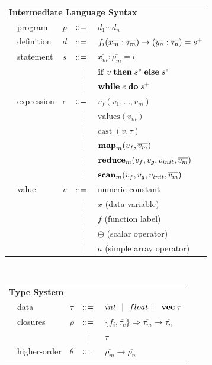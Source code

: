 \documentclass[preprint]{sigplanconf}
\begin{document}
  \begin{tabular}{m{0.1cm}m{1.5cm}m{0.1cm}m{0.2cm}p{4.8cm}}
   \multicolumn{5}{l}{\textbf{Intermediate Language Syntax}}  \\[4pt]
  & program & $p$ &  $::=$   &  $d_1 \cdots d_n $ \\[4pt]
  & definition & $d$ & $::=$ & $f_i(\overline{x_m} : \overline{\tau_m}) \rightarrow (\overline{y_n} : \overline{\tau_n}) =s^{\small{+}}$ \\[4pt]
  & statement  & $s$ & $::=$ & $\overline{x_m} : \overline{\rho_m} = e $\\[2pt]
  &            &     & $\ \ | \ \ $    & $\mbox{\textbf{if}} \;v\; \mbox{\textbf{then}} \;s^*\; \mbox{\textbf{else}} \;s^*$ \\[2pt]
  &            &     & $\ \ | \ \ $    & $\mbox{\textbf{while}} \;e\; \mbox{\textbf{do}} \;s^+\;  $ \\[4pt]
  & expression & $e$ & $::=$ & $ v_{f}(v_1, \ldots, v_m)$ \\[2pt]
  &            &     & $\ \ | \ \ $    & $\textrm{values} (\overline{v_m})$ \\[2pt]
  &            &     & $\ \ | \ \ $    & $\textrm{cast} \; (v, \tau)$ \\[2pt] 
  &            &     & $\ \ | \ \ $    & $\mbox{\textbf{map}}_m (v_{f},\overline{v_m})$ \\[2pt]
  &            &     & $\ \ | \ \ $    & $\mbox{\textbf{reduce}}_m (v_{f}, v_{g}, v_{init}, \overline{v_m})$ \\[2pt]
  &            &     & $\ \ | \ \ $    & $\mbox{\textbf{scan}}_m (v_{f}, v_{g}, v_{init}, \overline{v_m})$ \\[4pt]
  & value      & $v$ & $::=$ & numeric constant\\[2pt]
  &            &     & $\ \ | \ \ $    &  $x$  \quad \small{(data variable)} \\[2pt]
  &            &     & $\ \ | \ \ $    &  $f$  \quad \small{(function label)} \\[2pt]
  &            &     & $\ \ | \ \ $    &  $\oplus$ \quad \small{(scalar operator)} \\[2pt]
  &            &     & $\ \ | \ \ $    &  $a$ \quad \small{(simple array operator)} \\[4pt]
  \end{tabular}\\
  \begin{tabular}{m{0.005cm}m{1.8cm}m{0.05cm}m{0.2cm}p{4.8cm}}
  \multicolumn{5}{l}{\textbf{Type System}} \\[4pt]
  & data     & $\tau$    & $::=$ & $int \ \ | \ \  float \ \ | \ \  \mathbf{vec} \; \tau   $ \\[4pt]
  & closures        & $\rho$  & $::=$ & $\{f_i, \overline{\tau_{c}} \} \Rightarrow \overline{\tau_m} \rightarrow \overline{\tau_n}$\\[2pt]
  &                 &           & $\ \ | \ \ $    & $\tau$ \\[4pt]
  & higher-order    & $\theta$  & $::=$ & $\overline{\rho_m} \rightarrow \overline{\rho_n} $ \\[4pt]
  \end{tabular}
\end{document}
